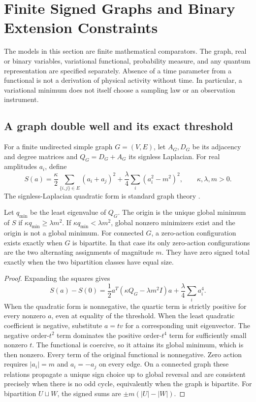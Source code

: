 \section{Finite Signed Graphs and Binary Extension Constraints}
\label{fin:chapter}

The models in this section are finite mathematical comparators.  The
graph, real or binary variables, variational functional, probability
measure, and any quantum representation are specified separately.
Absence of a time parameter from a functional is not a derivation of
physical activity without time.  In particular, a variational minimum
does not itself choose a sampling law or an observation instrument.

\subsection{A graph double well and its exact threshold}
\label{fin:graph-action}

For a finite undirected simple graph \(G=(V,E)\), let \(A_G,D_G\)
be its adjacency and degree matrices and \(Q_G=D_G+A_G\) its signless
Laplacian.  For real amplitudes \(a_i\), define
\[
 S(a)=\frac{\kappa}{2}\sum_{\{i,j\}\in E}(a_i+a_j)^2
       +\frac{\lambda}{4}\sum_i(a_i^2-m^2)^2,
 \qquad \kappa,\lambda,m>0 .
\]
The signless-Laplacian quadratic form is standard graph theory
\cite{fin:signless}.

\begin{theorem}\label{fin:threshold}
Let \(q_{\min}\) be the least eigenvalue of \(Q_G\).
The origin is the unique global minimum of \(S\) if
\(\kappa q_{\min}\ge\lambda m^2\).
If \(\kappa q_{\min}<\lambda m^2\), global nonzero minimizers exist and
the origin is not a global minimum.
For connected \(G\), a zero-action configuration exists exactly when
\(G\) is bipartite.  In that case its only zero-action configurations
are the two alternating assignments of magnitude \(m\).
They have zero signed total exactly when the two bipartition classes
have equal size.
\end{theorem}
\begin{proof}
Expanding the squares gives
\[
 S(a)-S(0)=\frac12a^T(\kappa Q_G-\lambda m^2 I)a
                    +\frac{\lambda}{4}\sum_i a_i^4 .
\]
When the quadratic form is nonnegative, the quartic term is strictly
positive for every nonzero \(a\), even at equality of the threshold.
When the least quadratic coefficient is negative, substitute \(a=tv\)
for a corresponding unit eigenvector.  The negative order-\(t^2\)
term dominates the positive order-\(t^4\) term for sufficiently small
nonzero \(t\).  The functional is coercive, so it attains its global
minimum, which is then nonzero.
Every term of the original functional is nonnegative.  Zero action
requires \(|a_i|=m\) and \(a_i=-a_j\) on every edge.
On a connected graph these relations propagate a unique sign choice
up to global reversal and are consistent precisely when there is no
odd cycle, equivalently when the graph is bipartite.
For bipartition \(U\sqcup W\), the signed sums are
\(\pm m(|U|-|W|)\).
\end{proof}

